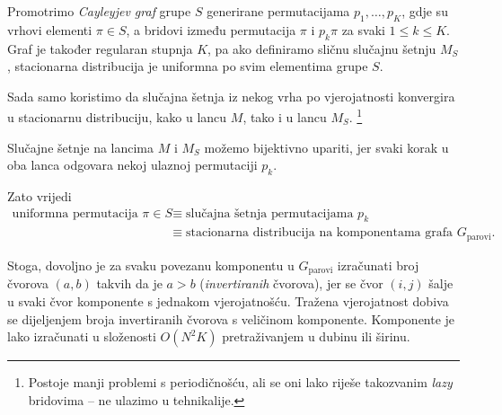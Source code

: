 Promotrimo \emph{Cayleyjev graf} grupe $S$ generirane permutacijama 
$p_1, \ldots, p_K$, gdje su vrhovi elementi $\pi \in S$, a bridovi
između permutacija $\pi$ i $p_k \pi$ za svaki $1 \le k \le K$.
Graf je također regularan stupnja $K$, pa ako definiramo sličnu slučajnu
šetnju $M_S$, stacionarna distribucija je uniformna po svim elementima
grupe $S$.

Sada samo koristimo da slučajna šetnja iz nekog vrha po vjerojatnosti
konvergira u stacionarnu distribuciju, kako u lancu $M$, tako i u
lancu $M_S$.
\footnote{Postoje manji problemi s periodičnošću, ali se oni lako riješe 
takozvanim \textit{lazy} bridovima -- ne ulazimo u tehnikalije.}

Slučajne šetnje na lancima $M$ i $M_S$ možemo bijektivno upariti, jer svaki
korak u oba lanca odgovara nekoj ulaznoj permutaciji $p_k$.

Zato vrijedi
\begin{align*}
  \text{uniformna permutacija } \pi \in S 
  &\equiv \text{slučajna šetnja permutacijama } p_k \\
  &\equiv \text{stacionarna distribucija na komponentama grafa }
  G_\text{parovi}.
\end{align*}

Stoga, dovoljno je za svaku povezanu komponentu u $G_\text{parovi}$ 
izračunati broj čvorova $(a, b)$ takvih da je $a > b$ (\textit{invertiranih}
čvorova),
jer se čvor $(i, j)$ šalje u svaki čvor komponente s jednakom vjerojatnošću.
Tražena vjerojatnost dobiva se dijeljenjem broja invertiranih čvorova
s veličinom komponente.
Komponente je lako izračunati u složenosti $O(N^2 K)$ pretraživanjem u dubinu
ili širinu.

